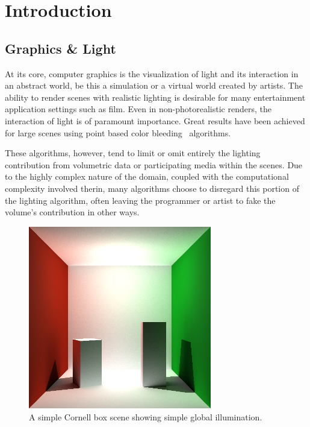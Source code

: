 \documentclass[12pt]{ucthesis}
\begin{document}
\pagestyle{plain}




\renewcommand{\baselinestretch}{1.66}







\chapter{Introduction}
\label{intro}

\section{Graphics \& Light}
At its core, computer graphics is the visualization of light and its interaction in an abstract world, be this a simulation or a virtual world created by artists.  The ability to render scenes with realistic lighting is desirable for many entertainment application settings such as film.  Even in non-photorealistic renders, the interaction of light is of paramount importance.  Great results have been achieved for large scenes using point based color bleeding~\cite{christensen:2008} algorithms.

These algorithms, however, tend to limit or omit entirely the lighting contribution from volumetric data or participating media within the scenes.  Due to the highly complex nature of the domain, coupled with the computational complexity involved therin, many algorithms choose to disregard this portion of the lighting algorithm, often leaving the programmer or artist to fake the volume's contribution in other ways.

\begin{figure}[h!]
    \centering
    \includegraphics[width=80mm]{img/indirect_box_high.png}
    \caption{A simple Cornell box scene showing simple global illumination.}
    \label{fig:cornell}
\end{figure}
\end{document}
